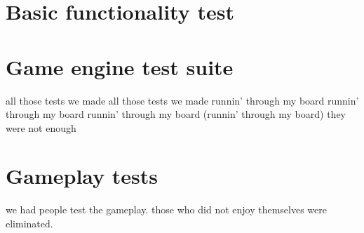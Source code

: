 \section{Basic functionality test}

\section{Game engine test suite}
	all those tests we made
	all those tests we made
	runnin' through my board
	runnin' through my board
	runnin' through my board
	(runnin' through my board)
	they were not enough

\section{Gameplay tests}
	we had people test the gameplay.
	those who did not enjoy themselves were eliminated.
